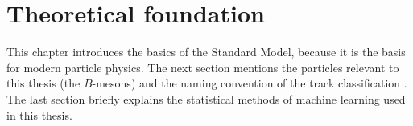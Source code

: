 \chapter{Theoretical foundation}

This chapter introduces the basics of the Standard Model, because it is the basis for modern particle physics.
The next section mentions the particles relevant to this thesis (the $B$-mesons) and the naming convention of the track classification .
The last section briefly explains the statistical methods of machine learning used in this thesis.




